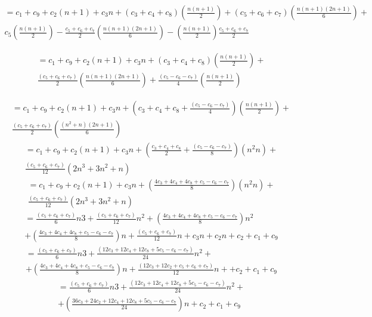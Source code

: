 \documentclass[11pt]{article}
\begin{document}
\begin{enumerate}[label=\Roman*.]
\begin{enumerate}[label=\alph*)]
         \begin{multline*}
            = c_1 + c_9 + c_2(n+1)+ c_3n+ (c_3+c_4+c_8)\left(\frac{n(n+1)}{2}\right)+ (c_5+c_6+c_7)\left(\frac{n(n+1)(2n+1)}{6}\right)+\\
            c_5\left(\frac{n(n+1)}{2}\right)-\frac{c_5+c_6+c_7}{2}\left(\frac{n(n+1)(2n+1)}{6}\right)-\left(\frac{n(n+1)}{2}\right)\frac{c_5+c_6+c_7}{2}
         \end{multline*}

        \begin{multline*}
            = c_1 + c_9 + c_2(n+1)+ c_3n+ (c_3+c_4+c_8)\left(\frac{n(n+1)}{2}\right)+ \\
            \frac{(c_5+c_6+c_7)}{2}\left(\frac{n(n+1)(2n+1)}{6}\right)+            \frac{(c_5-c_6-c_7)}{4}\left(\frac{n(n+1)}{2}\right)
         \end{multline*}

        \begin{multline*}
            = c_1 + c_9 + c_2(n+1)+ c_3n+ \left(c_3+c_4+c_8+\frac{(c_5-c_6-c_7)}{4}\right)\left(\frac{n(n+1)}{2}\right)+ \\
            \frac{(c_5+c_6+c_7)}{2}\left(\frac{(n^{2}+n)(2n+1)}{6}\right)
         \end{multline*}
        \begin{multline*}
            = c_1 + c_9 + c_2(n+1)+ c_3n+ \left(\frac{c_3+c_4+c_8}{2}+\frac{(c_5-c_6-c_7)}{8}\right)(n^{2}n)+ \\
            \frac{(c_5+c_6+c_7)}{12}(2n^{3}+3n^{2}+n)
         \end{multline*}
        \begin{multline*}
            = c_1 + c_9 + c_2(n+1)+ c_3n+ \left(\frac{4c_3+4c_4+4c_8+c_5-c_6-c_7}{8}\right)(n^{2}n)+ \\
            \frac{(c_5+c_6+c_7)}{12}(2n^{3}+3n^{2}+n)
         \end{multline*}
        \begin{multline*}
            = \frac{(c_5+c_6+c_7)}{6}n3+\frac{(c_5+c_6+c_7)}{12}n^{2}+\left(\frac{4c_3+4c_4+4c_8+c_5-c_6-c_7}{8}\right)n^{2}\\
            +\left(\frac{4c_3+4c_4+4c_8+c_5-c_6-c_7}{8}\right)n+\frac{(c_5+c_6+c_7)}{12}n+c_3n+c_2n+c_2+c_1 + c_9  
         \end{multline*}
        \begin{multline*}
            = \frac{(c_5+c_6+c_7)}{6}n3+\frac{(12c_3+12c_4+12c_8+5c_5-c_6-c_7)}{24}n^{2}+\\
            +\left(\frac{4c_3+4c_4+4c_8+c_5-c_6-c_7}{8}\right)n+\frac{(12c_3+12c_2+c_5+c_6+c_7)}{12}n++c_2+c_1 + c_9  
         \end{multline*}
        \begin{multline*}
            = \frac{(c_5+c_6+c_7)}{6}n3+\frac{(12c_3+12c_4+12c_8+5c_5-c_6-c_7)}{24}n^{2}+\\
            +\left(\frac{36c_3+24c_2+12c_4+12c_8+5c_5-c_6-c_7}{24}\right)n+c_2+c_1 + c_9  
         \end{multline*}
        

\end{enumerate}
\end{enumerate}
\end{document}
